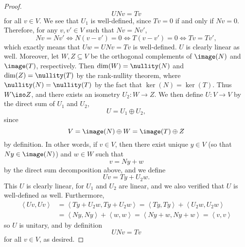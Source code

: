 \documentclass[linearalgebraII]{subfiles}
\begin{document}
\begin{proof}
        \begin{equation*}
            UNv = Tv
        \end{equation*}
        for all $v\in V$. We see that $U_1$ is well-defined, since $Tv=0$ if and only if $Nv = 0$. Therefore, for any $v,v'\in V$ such that $Nv = Nv'$,
        \begin{equation*}
            Nv = Nv' \iff N\left( v-v' \right) = 0 \iff T\left(  v-v' \right) = 0 \iff Tv = Tv',
        \end{equation*}
        which exactly means that $Uw = UNv = Tv$ is well-defined. $U$ is clearly linear as well. Moreover, let $W, Z\subseteq V$ be the orthogonal complements of $\image(N)$ and $\image(T)$, respectively. Then $\dim(W) = \nullity(N)$ and $\dim(Z) = \nullity(T)$ by the rank-nullity theorem, where $\nullity(N)=\nullity(T)$ by the fact that $\ker(N)=\ker(T)$. Thus $W\iso Z$, and there exists an isometry $U_2:W\to Z$. We then define $U:V\to V$ by the direct sum of $U_1$ and $U_2$,
        \begin{equation*}
            U = U_1\oplus U_2,
        \end{equation*}
        since
        \begin{equation*}
            V = \image(N)\oplus W = \image(T)\oplus Z
        \end{equation*}
        by definition. In other words, if $v\in V$, then there exist unique $y\in V$ (so that $Ny\in \image(N)$) and $w\in W$ such that
        \begin{equation*}
            v = Ny + w
        \end{equation*}
        by the direct sum decomposition above, and we define
        \begin{equation*}
            Uv = Ty + U_2w.
        \end{equation*}
        This $U$ is clearly linear, for $U_1$ and $U_2$ are linear, and we also verified that $U$ is well-defined as well. Furthermore,
        \begin{align*}
            \left\langle Uv, Uv\right\rangle & = \left\langle Ty+U_2w, Ty+U_2w\right\rangle = \left\langle Ty, Ty\right\rangle + \left\langle U_2w, U_2w\right\rangle \\
                                             & = \left\langle Ny, Ny\right\rangle + \left\langle w, w\right\rangle = \left\langle Ny+w, Ny+w\right\rangle = \left\langle v, v\right\rangle 
        \end{align*} 
        so $U$ is unitary, and by definition
        \begin{equation*}
            UNv = Tv
        \end{equation*}
        for all $v\in V$, as desired.
    \end{proof}
\end{document}
